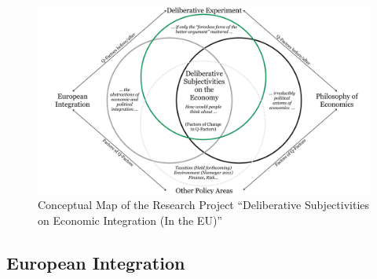 \documentclass[11pt,a4paper,oneside,english]{article}
\begin{document}
\begin{landscape}
 \begin{figure}[htbp]
    \begin{center}
	\includegraphics[width=1\linewidth]{img/deliberative-subjectivities}
	\caption{Conceptual Map of the Research Project ``Deliberative Subjectivities on Economic Integration (In the EU)''}
	\label{fig:deliberative-subjectivities}
	\end{center}
\end{figure}
\end{landscape}

\subsection[European Integration]{European Integration} \label{sec:european-integration}




\end{document}
